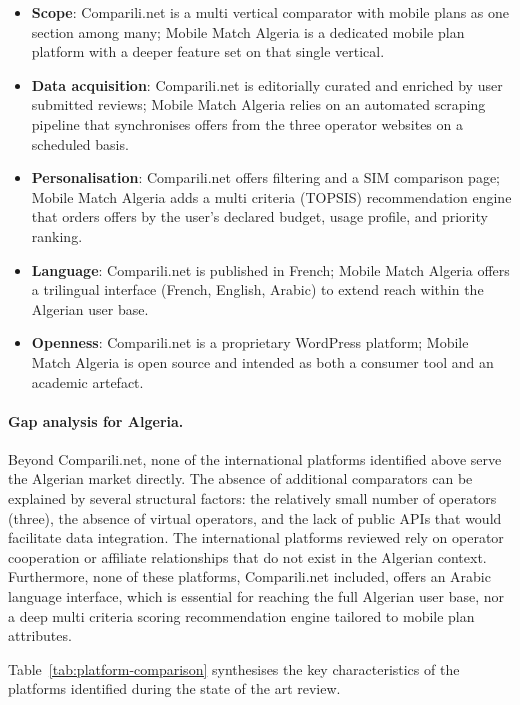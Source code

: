 \begin{itemize}
  \item \textbf{Scope}: Comparili.net is a multi vertical comparator with mobile plans as one section among many; Mobile Match Algeria is a dedicated mobile plan platform with a deeper feature set on that single vertical.
  \item \textbf{Data acquisition}: Comparili.net is editorially curated and enriched by user submitted reviews; Mobile Match Algeria relies on an automated scraping pipeline that synchronises offers from the three operator websites on a scheduled basis.
  \item \textbf{Personalisation}: Comparili.net offers filtering and a SIM comparison page; Mobile Match Algeria adds a multi criteria (TOPSIS) recommendation engine that orders offers by the user's declared budget, usage profile, and priority ranking.
  \item \textbf{Language}: Comparili.net is published in French; Mobile Match Algeria offers a trilingual interface (French, English, Arabic) to extend reach within the Algerian user base.
  \item \textbf{Openness}: Comparili.net is a proprietary WordPress platform; Mobile Match Algeria is open source and intended as both a consumer tool and an academic artefact.
\end{itemize}

\paragraph{Gap analysis for Algeria.}
Beyond Comparili.net, none of the international platforms identified above serve the Algerian market directly. The absence of additional comparators can be explained by several structural factors: the relatively small number of operators (three), the absence of virtual operators, and the lack of public APIs that would facilitate data integration. The international platforms reviewed rely on operator cooperation or affiliate relationships that do not exist in the Algerian context. Furthermore, none of these platforms, Comparili.net included, offers an Arabic language interface, which is essential for reaching the full Algerian user base, nor a deep multi criteria scoring recommendation engine tailored to mobile plan attributes.

Table~\ref{tab:platform-comparison} synthesises the key characteristics of the platforms identified during the state of the art review.


